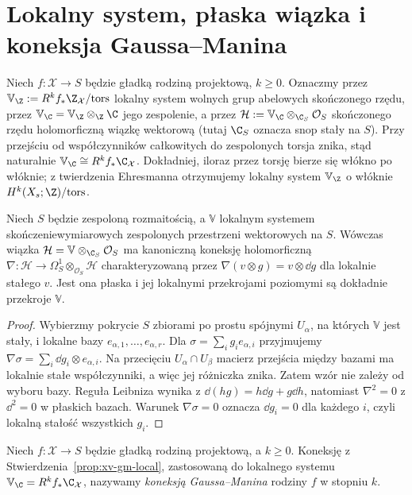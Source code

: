 \section{Lokalny system, płaska wiązka i koneksja Gaussa--Manina}
\begin{definicja}
Niech $f:\mathcal X\to S$ będzie gładką rodziną projektową,
$k\ge0$. Oznaczmy przez
$\mathbb V_{\Z}:=R^kf_*\Z_{\mathcal X}/\mathrm{tors}$
lokalny system wolnych grup abelowych skończonego rzędu,
przez $\mathbb V_{\C}=\mathbb V_{\Z}\otimes_{\Z}\C$
jego zespolenie, a przez
$\mathcal H:=\mathbb V_{\C}\otimes_{\C_S}\mathcal O_S$
skończonego rzędu holomorficzną wiązkę wektorową
(tutaj $\C_S$ oznacza snop stały na $S$).
Przy przejściu od współczynników całkowitych do zespolonych
torsja znika, stąd naturalnie
$\mathbb V_{\C}\cong R^kf_*\C_{\mathcal X}$.
Dokładniej, iloraz przez torsję bierze się włókno po włóknie;
z twierdzenia Ehresmanna otrzymujemy lokalny system
$\mathbb V_{\Z}$ o włóknie $H^k(X_s;\Z)/\mathrm{tors}$.
\end{definicja}
\begin{stwierdzenie}
\label{prop:xv-gm-local}
Niech $S$ będzie zespoloną rozmaitością, a
$\mathbb V$ lokalnym systemem skończeniewymiarowych
zespolonych przestrzeni wektorowych na $S$. Wówczas wiązka
$\mathcal H=\mathbb V\otimes_{\C_S}\mathcal O_S$
ma kanoniczną koneksję holomorficzną
$\nabla:\mathcal H\to\Omega_S^1\otimes_{\mathcal O_S}\mathcal H$
charakteryzowaną przez $\nabla(v\otimes g)=v\otimes\dd g$
dla lokalnie stałego $v$. Jest ona płaska i jej lokalnymi
przekrojami poziomymi są dokładnie przekroje $\mathbb V$.
\end{stwierdzenie}
\begin{proof}
Wybierzmy pokrycie $S$ zbiorami po prostu spójnymi $U_\alpha$,
na których $\mathbb V$ jest stały, i lokalne bazy
$e_{\alpha,1},\dots,e_{\alpha,r}$. Dla
$\sigma=\sum_ig_ie_{\alpha,i}$ przyjmujemy
$\nabla\sigma=\sum_i\dd g_i\otimes e_{\alpha,i}$.
Na przecięciu $U_\alpha\cap U_\beta$ macierz przejścia
między bazami ma lokalnie stałe współczynniki, a więc
jej różniczka znika. Zatem wzór nie zależy od wyboru bazy.
Reguła Leibniza wynika z $\dd(hg)=h\dd g+g\dd h$,
natomiast $\nabla^2=0$ z $\dd^2=0$ w płaskich bazach.
Warunek $\nabla\sigma=0$ oznacza $\dd g_i=0$ dla każdego $i$,
czyli lokalną stałość wszystkich $g_i$.
\end{proof}
\begin{definicja}
Niech $f:\mathcal X\to S$ będzie gładką
rodziną projektową, a $k\ge0$. Koneksję z
Stwierdzenia~\ref{prop:xv-gm-local}, zastosowaną do
lokalnego systemu $\mathbb V_{\C}=R^kf_*\C_{\mathcal X}$,
nazywamy \emph{koneksją Gaussa--Manina}
rodziny $f$ w stopniu $k$.
\end{definicja}
